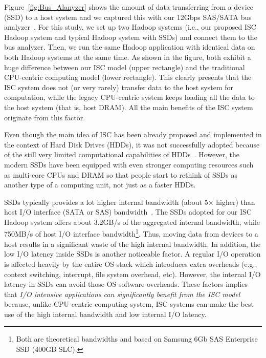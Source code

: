 Figure~\ref{fig:Bus_Alanyzer} shows the amount of data transferring from a device (SSD) to a host system and we captured this with our 12Gbps SAS/SATA bus analyzer~\cite{BusAnalyzer:JDSU:techspec}. For this study, we set up two Hadoop systems (i.e., our proposed ISC Hadoop system and typical Hadoop system with SSDs) and connect them to the bus analyzer. Then, we run the same Hadoop application with identical data on both Hadoop systems at the same time. As shown in the figure, both exhibit a huge difference between our ISC model (upper rectangle) and the traditional CPU-centric computing model (lower rectangle). This clearly presents that the ISC system does not (or very rarely) transfer data to the host system for computation, while the legacy CPU-centric system keeps loading all the data to the host system (that is, host DRAM). All the main benefits of the ISC system originate from this factor.


Even though the main idea of ISC has been already proposed and implemented in the context of Hard Disk Drives (HDDs), it was not successfully adopted because of the still very limited computational capabilities of HDDs~\cite{Keeton1998,ActiveDisks:ASPLOS:1998}. However, the modern SSDs have been equipped with even stronger computing resources such as multi-core CPUs and DRAM so that people start to rethink of SSDs as another type of a computing unit, not just as a faster HDDs. 

SSDs typically provides a lot higher internal bandwidth (about 5$\times$ higher) than host I/O interface (SATA or SAS) bandwidth~\cite{SmartSSD:SIGMOD:2013,Minerva:De:2013}. The SSDs adopted for our ISC Hadoop system offers about 3.2GB/s of the aggregated internal bandwidth, while 750MB/s of host I/O interface bandwidth\footnote{\small Both are theoretical bandwidths and based on Samsung 6Gb SAS Enterprise SSD (400GB SLC).}. Thus, moving data from devices to a host results in a significant waste of the high internal bandwidth. 
In addition, the low I/O latency inside SSDs is another noticeable factor. A regular I/O operation is affected heavily by the entire OS stack which introduces extra overheads (e.g., context switching, interrupt, file system overhead, etc). However, the internal I/O latency in SSDs can avoid those OS software overheads. These factors implies that \emph{I/O intensive applications can significantly benefit from the ISC model} because, unlike CPU-centric computing system, ISC systems can make the best use of the high internal bandwidth and low internal I/O latency. 

